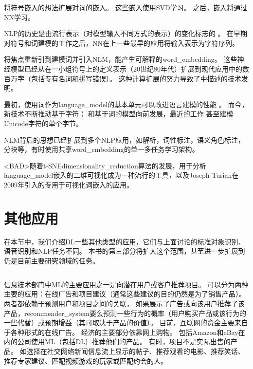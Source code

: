 \cite{Deerwester90}将符号嵌入的想法扩展对词的嵌入。
这些嵌入使用SVD学习。 
之后，嵌入将通过\gls{NN}学习。

\gls{NLP}的历史是由流行表示（对模型输入不同方式的表示）的变化标志的  。
在早期对符号和词建模的工作之后，\gls{NN}在上一些最早的应用\citep{Miikkulainen91,Schmidhuber96}将输入表示为字符序列。

\citet{BenDucVin01-small} 将焦点重新引到建模词并引入\gls{NLM}，能产生可解释的\gls{word_embedding}。
这些神经模型已经从在一小组符号上的定义表示（20世纪80年代）扩展到现代应用中的数百万字（包括专有名词和拼写错误）。
这种计算扩展的努力导致了中描述的技术发明。


最初，使用词作为\gls{language_model}的基本单元可以改进语言建模的性能 \citep{BenDucVin01-small}。
而今，新技术不断推动基于字符 \citep{Sutskever-et-al-ICML2011}）和基于词的模型向前发展，最近的工作 \citep{gillick2015multilingual}甚至建模Unicode字符的单个字节。

\gls{NLM}背后的思想已经扩展到多个\gls{NLP}应用，如解析\citep{Henderson-NAACL2003,Henderson-ACL2004,Collobert-AISTATS2011}，词性标注，语义角色标注，分块等，有时使用共享\gls{word_embedding}的单一多任务学习架构\citep{Collobert+Weston-ICML2008,collobert2011natural}。

<BAD>随着t-SNE\gls{dimensionality_reduction}算法的发展\citep{VanDerMaaten08-small}，用于分析\gls{language_model}嵌入的二维可视化成为一种流行的工具，以及Joseph Turian在2009年引入的专用于可视化词嵌入的应用。

\section{其他应用}
\label{sec:other_applications}

在本节中，我们介绍\gls{DL}一些其他类型的应用，它们与上面讨论的标准对象识别、语音识别和\gls{NLP}任务不同。
本书的第三部分将扩大这个范围，甚至进一步扩展到仍是目前主要研究领域的任务。


\subsection{}
\label{sec:recommender_systems}
信息技术部门中\gls{ML}的主要应用之一是向潜在用户或客户推荐项目。
可以分为两种主要的应用：在线广告和项目建议（通常这些建议的目的仍然是为了销售产品）。
两者都依赖于预测用户和项目之间的关联， 如果展示了广告或向该用户推荐了该产品，\gls{recommender_system}要么预测一些行为的概率（用户购买产品或该行为的一些代替）或预期增益（其可取决于产品的价值）。
目前，互联网的资金主要来自于各种形式的在线广告。
经济的主要部分依靠网上购物。 
包括Amazon和eBay在内的公司使用\gls{ML}（包括\gls{DL}）推荐他们的产品。
有时，项目不是实际出售的产品。
如选择在社交网络新闻信息流上显示的帖子、推荐观看的电影、推荐笑话、推荐专家建议、匹配视频游戏的玩家或匹配约会的人。

